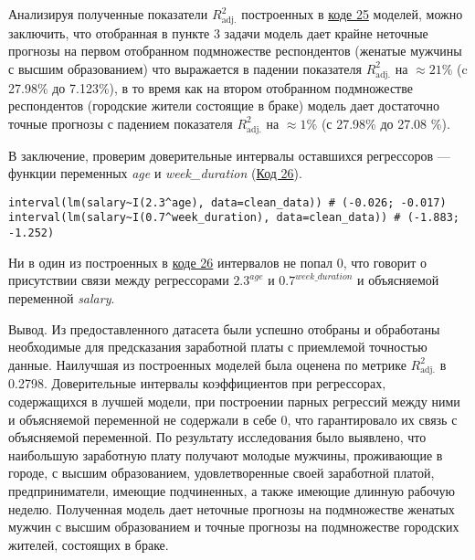 Анализируя полученные показатели $R^{2}_{\text{adj.}}$ построенных в \hyperref[code:25]{коде 25} моделей, можно заключить, что отобранная в пункте 3 задачи модель дает крайне неточные прогнозы на первом отобранном подмножестве респондентов (женатые мужчины с высшим образованием) что выражается в падении показателя $R^{2}_{\text{adj.}}$ на $\approx 21\%$ (c 27.98\% до 7.123\%), в то время как на втором отобранном подмножестве респондентов (городские жители состоящие в браке) модель дает достаточно точные прогнозы с падением показателя $R^{2}_{\text{adj.}}$ на $\approx 1\%$ (с 27.98\% до 27.08
\%).

В заключение, проверим доверительные интервалы оставшихся регрессоров --- функции переменных \textit{age} и \textit{week\_duration} (\hyperref[code:26]{Код 26}).

\begin{code}
\begin{verbatim}
interval(lm(salary~I(2.3^age), data=clean_data)) # (-0.026; -0.017)
interval(lm(salary~I(0.7^week_duration), data=clean_data)) # (-1.883; -1.252)
\end{verbatim}
\label{code:26}
\end{code}

Ни в один из построенных в \hyperref[code:26]{коде 26} интервалов не попал 0, что говорит о присутствии связи между регрессорами $2.3^{\textit{age}}$ и $0.7^{\textit{week\_duration}}$ и объясняемой переменной \textit{salary}. 

Вывод. Из предоставленного датасета были успешно отобраны и обработаны необходимые для предсказания заработной платы с приемлемой точностью данные. Наилучшая из построенных моделей была оценена по метрике $R^{2}_{\text{adj.}}$ в 0.2798. Доверительные интервалы коэффициентов при регрессорах, содержащихся в лучшей модели, при построении парных регрессий между ними и объясняемой переменной не содержали в себе 0, что гарантировало их связь с объясняемой переменной. По результату исследования было выявлено, что наибольшую заработную плату получают молодые мужчины, проживающие в городе, с высшим образованием, удовлетворенные своей заработной платой, предприниматели, имеющие подчиненных, а также имеющие длинную рабочую неделю. Полученная модель дает неточные прогнозы на подмножестве женатых мужчин с высшим образованием и точные прогнозы на подмножестве городских жителей, состоящих в браке.


\newpage
{}
